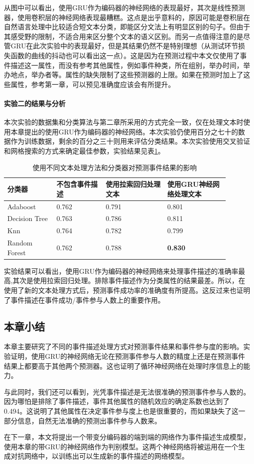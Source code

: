 从图中可以看出，使用GRU作为编码器的神经网络的表现最好，其次是线性预测器，使用卷积层的神经网络表现最糟糕。这点是出乎意料的，原因可能是卷积层在自然语言处理中比较适合短文本分类，即能区分文法上有明显区别的句子。但由于其感受野的限制，不适合用来区分整个文本的语义区别。而另一点值得注意的是尽管GRU在此次实验中的表现最好，但是其结果仍然不是特别理想（从测试环节损失函数的曲线的抖动也可以看出这一点）。这是因为在预测过程中本文仅使用了事件描述这一属性，而没有参考其他属性，例如事件种类，所在组别，举办时间，举办地点，举办者等。属性的缺失限制了这些预测器的上限。如果在预测时加上了这些属性，参考第一章，可以预见准确度应该会有所提升。 
\paragraph{实验二的结果与分析}\label{train_discrimiator}
本次实验的数据集和分类算法与第二章所采用的方式完全一致，仅在处理文本时使用本章提出的使用GRU作为编码器的神经网络。本次实验仍使用百分之七十的数据作为训练数据，剩余的百分之三十则用来评估分类结果。本次实验使用交叉验证和网格搜索的方式来确定最佳参数，实验结果见表\ref{t2-2}。

\begin{table}[htb] 
    \centering
    \caption{\label{t2-2}使用不同文本处理方法和分类器对预测事件结果的影响}
    \begin{tabular*}{\linewidth}{p{0.2\linewidth}m{0.2\linewidth}p{0.25\linewidth}p{0.25\linewidth}}
\toprule 
分类器&不包含事件描述&使用拉索回归处理文本&使用GRU神经网络处理文本\\
\midrule
Adaboost & 0.762 & 0.791 & 0.801 \\
Decision Tree& 0.763 & 0.786 & 0.811\\
Knn & 0.764 & 0.782 & 0.799 \\
Random Forest & 0.762 & 0.788 & \textbf{0.830} \\
\bottomrule
    \end{tabular*}
\end{table}

实验结果可以看出，使用$\mathrm{GRU}$作为编码器的神经网络来处理事件描述的准确率最高,其次是使用拉索回归处理。排除事件描述作为分类属性的结果最差。所以，在使用了新的文本处理方式后，预测事件成功率的准确度有所提高。这反过来也证明了事件描述在事件成功/事件参与人数上的重要作用。
\subsection{本章小结}
本章主要研究了不同的事件描述处理方式对预测事件结果和事件参与度的影响。实验证明，使用GRU的神经网络无论在预测事件参与人数的精度上还是在预测事件结果上都要高于其他两个预测器。这也证明了循环神经网络在处理时序信息上的能力。

与此同时，我们还可以看到，光凭事件描述是无法很准确的预测事件参与人数的。因为哪怕是排除了事件描述，事件其他属性的随机效应的确定系数也达到了0.494。这说明了其他属性在决定事件参与度上也是很重要的，而如果缺失了这一部分信息，自然无法准确的预测出事件参与人数来。

在下一章，本文将提出一个带变分编码器的端到端的网络作为事件描述生成模型，使用本章的带GRU的神经网络作为判别模型。这两个神经网络将被运用在一个生成对抗网络中，以训练出可以生成新的事件描述的网络模型。
%  